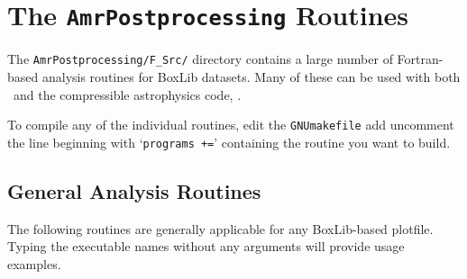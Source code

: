 \section{The {\tt AmrPostprocessing} Routines}
\label{sec:analysis}

The {\tt AmrPostprocessing/F\_Src/} directory contains a large
number of Fortran-based analysis routines for BoxLib datasets.  Many
of these can be used with both \maestro\ and the compressible
astrophysics code, \castro.

To compile any of the individual routines, edit the {\tt GNUmakefile}
add uncomment the line beginning with `{\tt programs +=}' containing
the routine you want to build.

\subsection{General Analysis Routines}

The following routines are generally applicable for any BoxLib-based
plotfile.  Typing the executable names without any arguments will
provide usage examples.

